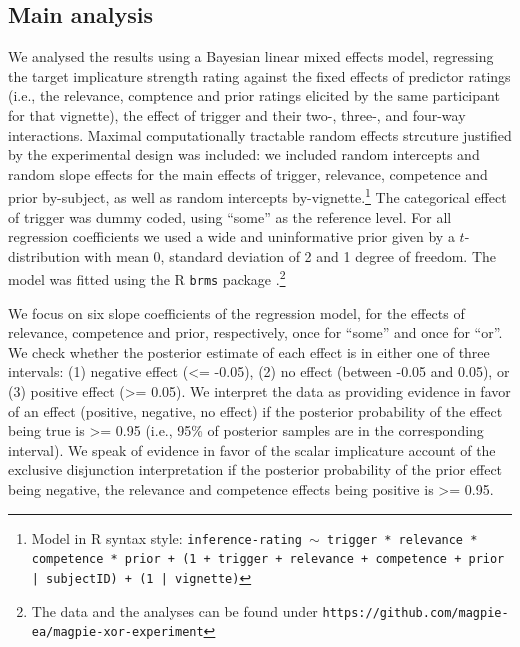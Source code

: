 \documentclass{sp}
\begin{document}
\subsection{Main analysis}
We analysed the results using a Bayesian linear mixed effects model, regressing the target implicature strength rating against the fixed effects of predictor ratings (i.e., the relevance, comptence and prior ratings elicited by the same participant for that vignette), the effect of trigger and their two-, three-, and four-way interactions. Maximal computationally tractable random effects strcuture justified by the experimental design was included: we included random intercepts and random slope effects for the main effects of trigger, relevance, competence and prior by-subject, as well as random intercepts by-vignette.\footnote{Model in R syntax style: \texttt{inference-rating $\sim$ trigger * relevance * competence * prior + (1 + trigger + relevance + competence + prior | subjectID) + (1 | vignette)}} 
The categorical effect of trigger was dummy coded, using ``some'' as the reference level. For all regression coefficients we used a wide and uninformative prior given by a $t$-distribution with mean 0, standard deviation of 2 and 1 degree of freedom. The model was fitted using the R \texttt{brms} package \citep{burkner2017brms}.\footnote{The data and the analyses can be found under \texttt{https://github.com/magpie-ea/magpie-xor-experiment}}

We focus on six slope coefficients of the regression model, for the effects of relevance, competence and prior, respectively, once for ``some'' and once for ``or''. We check whether the posterior estimate of each effect is in either one of three intervals: (1) negative effect (<= -0.05), (2) no effect (between -0.05 and 0.05), or (3) positive effect (>= 0.05). 
We interpret the data as providing evidence in favor of an effect (positive, negative, no effect) if the posterior probability of the effect being true is >= 0.95 (i.e., 95\% of posterior samples are in the corresponding interval). We speak of evidence in favor of the scalar implicature account of the exclusive disjunction interpretation if the posterior probability of the prior effect being negative, the relevance and competence effects being positive is >= 0.95. 
\end{document}
